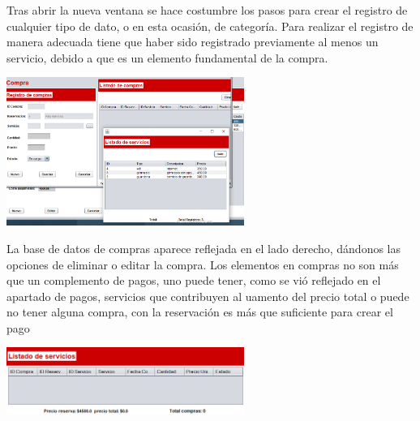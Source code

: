\documentclass[12pt]{article}
\begin{document}
\begin{flushleft}
\vspace{0.5cm}
\textsf{Tras abrir la nueva ventana se hace costumbre los pasos para crear el registro de cualquier tipo de dato, o en esta ocasión, de categoría. Para realizar el registro de manera adecuada tiene que haber sido registrado previamente al menos un servicio, debido a que es un elemento fundamental de la compra.}

\vspace{0.5cm}
\begin{center}
\includegraphics[width=7.75cm]{ec.png}
\end{center}

\vspace{0.5cm}
\textsf{La base de datos de compras aparece reflejada en el lado derecho, dándonos las opciones de eliminar o editar la compra. Los elementos en compras no son más que un complemento de pagos, uno puede tener, como se vió reflejado en el apartado de pagos, servicios que contribuyen al uamento del precio total o puede no tener alguna compra, con la reservación es más que suficiente para crear el pago}

\vspace{0.5cm}
\begin{center}
\includegraphics[width=7.75cm]{nocompra.png}
\end{center}


\end{flushleft}
\end{document}
